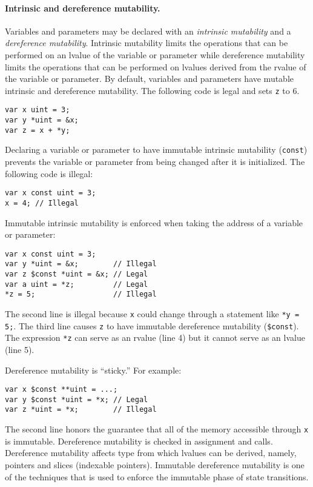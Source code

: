 \paragraph{Intrinsic and dereference mutability.}
Variables and parameters may be declared with an \emph{intrinsic mutability} and a \emph{dereference mutability}.
Intrinsic mutability limits the operations that can be performed on an lvalue of the variable or parameter while dereference mutability limits the operations that can be performed on lvalues derived from the rvalue of the variable or parameter.
By default, variables and parameters have mutable intrinsic and dereference mutability.
The following code is legal and sets \verb+z+ to 6.
\begin{verbatim}
var x uint = 3;
var y *uint = &x;
var z = x + *y;
\end{verbatim}

Declaring a variable or parameter to have immutable intrinsic mutability (\verb+const+) prevents the variable or parameter from being changed after it is initialized.
The following code is illegal:
\begin{verbatim}
var x const uint = 3;
x = 4; // Illegal
\end{verbatim}
Immutable intrinsic mutability is enforced when taking the address of a variable or parameter:
\begin{verbatim}
var x const uint = 3;
var y *uint = &x;        // Illegal
var z $const *uint = &x; // Legal
var a uint = *z;         // Legal
*z = 5;                  // Illegal
\end{verbatim}
The second line is illegal because \verb+x+ could change through a statement like \verb+*y = 5;+.
The third line causes \verb+z+ to have immutable dereference mutability (\verb|$const|).
The expression \verb+*z+ can serve as an rvalue (line 4) but it cannot serve as an lvalue (line 5).

Dereference mutability is ``sticky.''
For example:
\begin{verbatim}
var x $const **uint = ...;
var y $const *uint = *x; // Legal
var z *uint = *x;        // Illegal
\end{verbatim}
The second line honors the guarantee that all of the memory accessible through \verb+x+ is immutable.
Dereference mutability is checked in assignment and calls.
Dereference mutability affects type from which lvalues can be derived, namely, pointers and slices (indexable pointers).
Immutable dereference mutability is one of the techniques that is used to enforce the immutable phase of state transitions.

